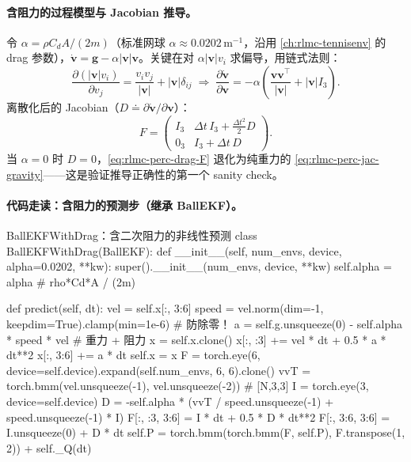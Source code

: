\paragraph{含阻力的过程模型与 Jacobian 推导。}令 $\alpha=\rho C_d A/(2m)$（标准网球 $\alpha\approx 0.0202$\,m$^{-1}$，沿用 \cref{ch:rlmc-tennisenv} 的 drag 参数），$\dot{\mathbf v}=\mathbf g-\alpha|\mathbf v|\mathbf v$。关键在对 $\alpha|\mathbf v|v_i$ 求偏导，用链式法则：
\begin{equation}
\frac{\partial(|\mathbf v|v_i)}{\partial v_j}=\frac{v_iv_j}{|\mathbf v|}+|\mathbf v|\delta_{ij}
\;\Rightarrow\;
\frac{\partial\dot{\mathbf v}}{\partial\mathbf v}=-\alpha\!\left(\frac{\mathbf v\mathbf v^{\!\top}}{|\mathbf v|}+|\mathbf v|I_3\right).
\label{eq:rlmc-perc-drag-jac}
\end{equation}
离散化后的 Jacobian（$D\doteq\partial\dot{\mathbf v}/\partial\mathbf v$）：
\begin{equation}
F=\begin{pmatrix} I_3 & \Delta t\,I_3+\tfrac{\Delta t^2}{2}D\\[2pt] 0_3 & I_3+\Delta t\,D\end{pmatrix}.
\label{eq:rlmc-perc-drag-F}
\end{equation}
当 $\alpha=0$ 时 $D=0$，\eqref{eq:rlmc-perc-drag-F} 退化为纯重力的 \eqref{eq:rlmc-perc-jac-gravity}——这是验证推导正确性的第一个 sanity check。

\paragraph{代码走读：含阻力的预测步（继承 BallEKF）。}

\begin{codebox}[Python]{BallEKFWithDrag：含二次阻力的非线性预测}
class BallEKFWithDrag(BallEKF):
    def __init__(self, num_envs, device, alpha=0.0202, **kw):
        super().__init__(num_envs, device, **kw)
        self.alpha = alpha                                  # rho*Cd*A / (2m)

    def predict(self, dt):
        vel = self.x[:, 3:6]
        speed = vel.norm(dim=-1, keepdim=True).clamp(min=1e-6)   # 防除零！
        a = self.g.unsqueeze(0) - self.alpha * speed * vel        # 重力 + 阻力
        x = self.x.clone()
        x[:, :3] += vel * dt + 0.5 * a * dt**2
        x[:, 3:6] += a * dt
        self.x = x
        F = torch.eye(6, device=self.device).expand(self.num_envs, 6, 6).clone()
        vvT = torch.bmm(vel.unsqueeze(-1), vel.unsqueeze(-2))     # [N,3,3]
        I = torch.eye(3, device=self.device)
        D = -self.alpha * (vvT / speed.unsqueeze(-1) + speed.unsqueeze(-1) * I)
        F[:, :3, 3:6] = I * dt + 0.5 * D * dt**2
        F[:, 3:6, 3:6] = I.unsqueeze(0) + D * dt
        self.P = torch.bmm(torch.bmm(F, self.P), F.transpose(1, 2)) + self._Q(dt)
\end{codebox}

